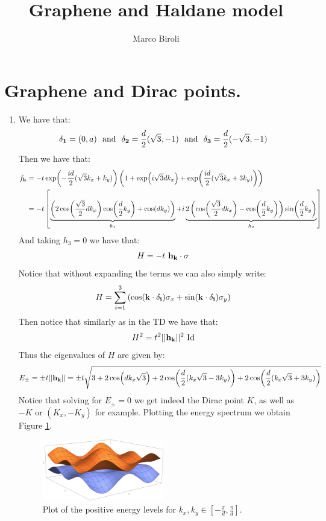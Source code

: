\documentclass[10pt,a4paper]{article}
\author{Marco Biroli}
\title{Graphene and Haldane model}
\begin{document}
\maketitle

\section{Graphene and Dirac points.}

\begin{enumerate}
\item  We have that:
\[
\vb{\delta_1} = (0, a) \mbox{~~and~~} \vb{\delta_2} = \frac{d}{2} (\sqrt{3}, -1) \mbox{~~and~~} \vb{\delta_3} = \frac{d}{2} (-\sqrt{3}, -1)
\]
Then we have that:
\begin{align*}
f_{\vb{k}} &= - t \exp(-\frac{i d}{2} (\sqrt{3} k_x + k_y)) \left( 1 + \exp(i \sqrt{3} d k_x) + \exp(\frac{i d}{2} (\sqrt{3} k_x + 3 k_y)) \right) \\
&= - t\left[ \underbrace{\left( 2 \cos(\frac{\sqrt{3}}{2} d k_x) \cos(\frac{d}{2} k_y) + \cos(d k_y) \right)}_{h_1} + i \underbrace{2 \left( \cos(\frac{\sqrt{3}}{2} d k_x) - \cos(\frac{d}{2} k_y) \right) \sin(\frac{d}{2} k_y)}_{h_2}
 \right]
\end{align*}
And taking $h_3 = 0$ we have that:
\[
H = -t \, \, \vb{h}_{\vb{k}} \cdot \vb{\sigma}
\]
Notice that without expanding the terms we can also simply write:
\[
H = \sum_{i = 1}^3 \left( \cos(\vb{k} \cdot \vb{\delta_i} ) \sigma_x + \sin(\vb{k} \cdot \vb{\delta_i}) \sigma_y \right)
\]
Then notice that similarly as in the TD we have that:
\[
H^2 = t^2 || \vb{h}_{\vb{k}} ||^2 \text{ Id}
\]
Thus the eigenvalues of $H$ are given by:
\[
E_\pm = \pm t || \vb{h_{\vb{k}}} || = \pm t \sqrt{3 + 2 \cos(d k_x \sqrt{3}) + 2 \cos(\frac{d}{2} (k_x\sqrt{3} - 3 k_y)) + 2 \cos(\frac{d}{2}(k_x\sqrt{3} + 3k_y))}
\]
Notice that solving for $E_\pm = 0$ we get indeed the Dirac point $K$, as well as $-K$ or $(K_x, - K_y)$ for example. Plotting the energy spectrum we obtain Figure \ref{eigenplot}.
\begin{figure} \label{eigenplot}
\centering
\includegraphics[width = 0.5\textwidth]{energylevels}
\caption{Plot of the positive energy levels for $k_x, k_y \in [-\frac{\pi}{d}, \frac{\pi}{d}]$.}
\end{figure}


\end{enumerate}
\end{document}
